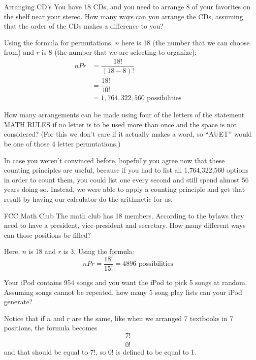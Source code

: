 \begin{example}[https://www.youtube.com/watch?v=vnvlFNwFUQc]{Arranging CD's}
You have 18 CDs, and you need to arrange 8 of your favorites on the shelf near your stereo.
How many ways can you arrange the CDs, assuming that the order of the CDs makes a
difference to you?

\sol
Using the formula for permutations, $n$ here is 18 (the number that we can choose from) and $r$ is 8 (the number that we are selecting to organize):
\begin{align*}
nPr &= \dfrac{18!}{(18-8)!}\\
&= \dfrac{18!}{10!}\\
&= \boxed{1,764,322,560 \textrm{ possibilities}}
\end{align*}
\end{example}

\begin{try}
How many arrangements can be made using four of the letters of the statement
MATH RULES if no letter is to be used more than once and the space is not considered? (For this we don't care if it
actually makes a word, so ``AUET'' would be one of those 4 letter permutations.)
\end{try}

In case you weren't convinced before, hopefully you agree now that these counting principles are useful, because if you had to list all 1,764,322,560 options in order to count them, you could list one every second and still spend almost 56 years doing so.  Instead, we were able to apply a counting principle and get that result by having our calculator do the arithmetic for us.
\pagebreak

\begin{example}[https://www.youtube.com/watch?v=XGwosYiNY2I]{FCC Math Club}
The math club has 18 members. According to the bylaws they need to have a president,
vice-president and secretary. How many different ways can those positions be filled?

\sol Here, $n$ is 18 and $r$ is 3.  Using the formula: \[nPr = \dfrac{18!}{15!} = \boxed{4896 \textrm{ possibilities}}\]
\end{example}

\begin{try}
Your iPod contains 954 songs and you want the iPod to pick 5 songs at random.
Assuming songs cannot be repeated, how many 5 song play lists can your iPod generate?
\end{try}

Notice that if $n$ and $r$ are the same, like when we arranged 7 textbooks in 7 positions, the formula becomes \[\dfrac{7!}{0!}\] and that should be equal to $7!$, so $0!$ is defined to be equal to 1.


